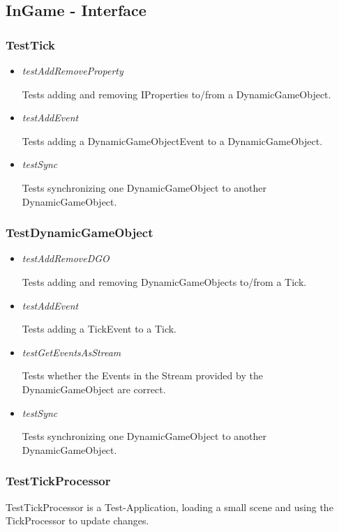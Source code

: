 \subsection{InGame - Interface}

\subsubsection{TestTick}
\begin{itemize}
    \item \textit{testAddRemoveProperty}
        \begin{leftbar}[0.9\linewidth]
            Tests adding and removing IProperties to/from a DynamicGameObject.
        \end{leftbar}

    \item \textit{testAddEvent}
        \begin{leftbar}[0.9\linewidth]
            Tests adding a DynamicGameObjectEvent to a DynamicGameObject.
        \end{leftbar}

    \item \textit{testSync}
        \begin{leftbar}[0.9\linewidth]
            Tests synchronizing one DynamicGameObject to another DynamicGameObject.
        \end{leftbar}
\end{itemize}

\subsubsection{TestDynamicGameObject}
\begin{itemize}
    \item \textit{testAddRemoveDGO}
        \begin{leftbar}[0.9\linewidth]
            Tests adding and removing DynamicGameObjects to/from a Tick.
        \end{leftbar}

    \item \textit{testAddEvent}
        \begin{leftbar}[0.9\linewidth]
            Tests adding a TickEvent to a Tick.
        \end{leftbar}

    \item \textit{testGetEventsAsStream}
        \begin{leftbar}[0.9\linewidth]
            Tests whether the Events in the Stream provided by the DynamicGameObject are correct.
        \end{leftbar}

    \item \textit{testSync}
        \begin{leftbar}[0.9\linewidth]
            Tests synchronizing one DynamicGameObject to another DynamicGameObject.
        \end{leftbar}
\end{itemize}

\subsubsection{TestTickProcessor}
TestTickProcessor is a Test-Application, loading a small scene and using the TickProcessor
to update changes.